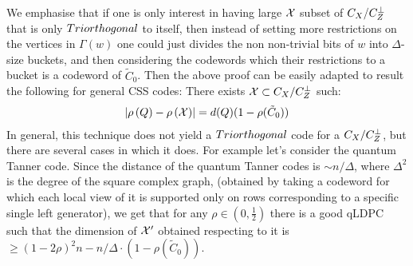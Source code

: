 \documentclass[manuscript,screen,review]{acmart}
\begin{document}
\begin{remark}
  We emphasise that if one is only interest in having large $  \mathcal{X}$ subset of $C_{X}/C_{Z}^\perp$ that is only $Triorthogonal$ to itself, then instead of setting more restrictions on the vertices in $\Gamma(w)$ one could just divides the non non-trivial bits of $w$ into $\Delta$-size buckets, and then considering the codewords which their restrictions to a bucket is a codeword of $\tilde{C}_{0}$. Then the above proof can be easily adapted to result the following for general CSS codes: There exists $\mathcal{X} \subset C_{X}/C_{Z}^\perp$ such:
\begin{equation*}
    \begin{split}
      \left| \rho\left(Q\right) - \rho\left( \mathcal{X} \right) \right| = d(Q)(1 - \rho(\tilde{C}_{0}))
    \end{split}
  \end{equation*}
  In general, this technique does not yield a $Triorthogonal$ code for a $C_{X}/C_{Z}^\perp$, but there are several cases in which it does. For example let's consider the quantum Tanner code. Since the distance of the quantum Tanner codes is $\sim n/\Delta$, where $\Delta^{2}$ is the degree of the square complex graph, (obtained by taking a codeword for which each local view of it is supported only on rows corresponding to a specific single left generator), we get that for any $\rho \in (0,\frac{1}{2})$ there is a good qLDPC such that the dimension of $\mathcal{X}^\prime$ obtained respecting to it is $\ge (1-2\rho)^{2}n - n/\Delta \cdot (1 - \rho(\tilde{C}_{0}))$.  
\end{remark}
\end{document}
